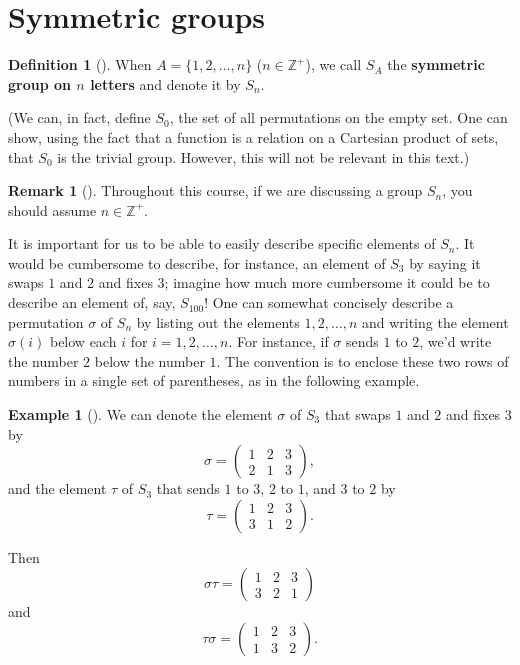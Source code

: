 \documentclass[10pt,]{book}
\newcommand{\terminology}[1]{\textbf{#1}}
\theoremstyle{plain}
\theoremstyle{definition}
\newtheorem{definition}[theorem]{Definition}
\theoremstyle{definition}
\newtheorem{remark}[theorem]{Remark}
\theoremstyle{definition}
\newtheorem{example}[theorem]{Example}
\theoremstyle{definition}
\numberwithin{equation}{section}
\def\Z{\mathbb{Z}}
\newcommand{\amp}{&}
\begin{document}
\section[{Symmetric groups}]{Symmetric groups}\label{symmgps}
\begin{definition}[{}]\label{definition-47}
\label{notation-57}
When \(A=\{1,2,\ldots, n\}\) (\(n\in \Z^+\)), we call \(S_A\) the \terminology{symmetric group on \(n\) letters} and denote it by \(S_n\).%
\par
(We can, in fact,  define \(S_0\), the set of all permutations on the empty set. One can show, using the fact that a function is a relation on a Cartesian product of sets, that \(S_0\) is the trivial group. However, this will not be relevant in this text.)%
\end{definition}
\begin{remark}[]\label{remark-26}
Throughout this course, if we are discussing a group \(S_n\), you should assume \(n\in \Z^+\).%
\end{remark}
It is important for us to be able to easily describe specific elements of \(S_n\). It would be cumbersome to describe, for instance, an element of \(S_3\) by saying it swaps \(1\) and \(2\) and fixes \(3\); imagine how much more cumbersome it could be to describe an element of, say, \(S_{100}\)! One can somewhat concisely describe a permutation \(\sigma\) of \(S_n\) by listing out the elements \(1,2,\ldots,n\) and writing the element \(\sigma(i)\) below each \(i\) for \(i=1,2,\ldots, n\). For instance, if \(\sigma\) sends \(1\) to \(2\), we'd write the number \(2\) below the number \(1\). The convention is to enclose these two rows of numbers in a single set of parentheses, as in the following example.%
\begin{example}[]\label{nocommute}
We can denote the element \(\sigma\) of \(S_3\) that swaps \(1\) and \(2\) and fixes \(3\) by%
\begin{equation*}
\sigma = \begin{pmatrix}1\amp 2\amp 3\\ 2\amp 1\amp 3
\end{pmatrix},
\end{equation*}
and the element \(\tau\) of \(S_3\) that sends \(1\) to \(3\), \(2\) to \(1\), and \(3\) to \(2\) by%
\begin{equation*}
\tau =\begin{pmatrix}1\amp 2\amp 3\\ 3\amp 1\amp 2
\end{pmatrix}.
\end{equation*}
%
\par
Then%
\begin{equation*}
\sigma\tau = \begin{pmatrix}1\amp 2\amp 3\\ 3\amp 2\amp 1
\end{pmatrix}
\end{equation*}
and%
\begin{equation*}
\tau\sigma = \begin{pmatrix}1\amp 2\amp 3\\ 1\amp 3\amp 2
\end{pmatrix}.
\end{equation*}
%
\end{example}
\end{document}
